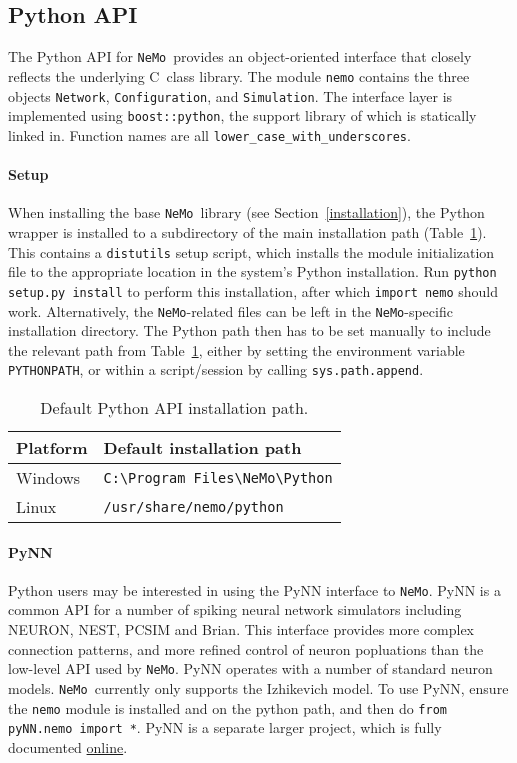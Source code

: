\documentclass[a4paper]{article}
\newcommand{\nemo}{\texttt{NeMo}}
\newcommand{\code}[1]{\texttt{#1}}
\newcommand{\command}[1]{\texttt{#1}}
\newcommand{\file}[1]{\texttt{#1}}
\newcommand{\library}[1]{\texttt{#1}}
\newcommand{\cpp}{C\nolinebreak\hspace{-.05em}\raisebox{.4ex}{\tiny\bf +}\nolinebreak\hspace{-.10em}\raisebox{.4ex}{\tiny\bf +}}
\begin{document}
\newpage

\subsection{Python API}
\label{api:python}

The Python API for \nemo\ provides an object-oriented interface
	that closely reflects the underlying \cpp\ class library.
The module \library{nemo} contains the three objects
	\code{Network},
	\code{Configuration}, and
	\code{Simulation}.
The interface layer is implemented using \library{boost::python},
	the support library of which is statically linked in.
Function names are all \code{lower\_case\_with\_underscores}.

\paragraph{Setup}
When installing the base \nemo\ library (see Section~\ref{installation}),
	the Python wrapper is installed to a subdirectory of the main installation path
	(Table~\ref{tab:python-path}).
This contains a \command{distutils} setup script,
	which installs the module initialization file to the appropriate 
	location in the system's Python installation.
Run \code{python setup.py install} to perform this installation,
	after which \code{import nemo} should work.
Alternatively,
	the \nemo-related files can be left in the \nemo-specific installation directory.
The Python path then has to be set manually to include the relevant path from Table~\ref{tab:python-path},
	either by setting the environment variable \command{PYTHONPATH},
	or within a script/session by calling \code{sys.path.append}.

\begin{table}[!hb]
	\centering
	\begin{tabular}{ll}
		Platform & Default installation path \\
		\hline
		Windows & \file{C:\textbackslash Program Files\textbackslash NeMo\textbackslash Python} \\
		Linux & \file{/usr/share/nemo/python} \\
		\hline
	\end{tabular}
	\caption{Default Python API installation path.}
	\label{tab:python-path}
\end{table}

\paragraph{PyNN}
Python users may be interested in using the PyNN interface to \nemo.
PyNN \cite{davison08pynn} is a common API for a number of spiking neural network simulators
	including NEURON, NEST, PCSIM and Brian.
This interface provides more complex connection patterns,
	and more refined control of neuron popluations
	than the low-level API used by \nemo.
PyNN operates with a number of standard neuron models.
\nemo\ currently only supports the Izhikevich model.
To use PyNN, ensure the \library{nemo} module is installed and on the python path,
	and then do \code{from pyNN.nemo import *}.
PyNN is a separate larger project, which is fully documented \href{http://neuralensemble.org/trac/PyNN}{online}.
\end{document}
